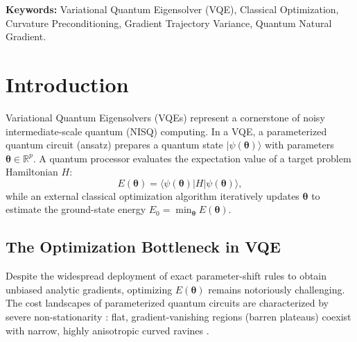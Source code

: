 \documentclass[11pt,a4paper]{article}
\begin{document}
\textbf{Keywords:} Variational Quantum Eigensolver (VQE), Classical Optimization, Curvature Preconditioning, Gradient Trajectory Variance, Quantum Natural Gradient.

\newpage

\section{Introduction}
\label{sec:intro}

Variational Quantum Eigensolvers (VQEs) \cite{peruzzo2014variational,mcclean2016theory} represent a cornerstone of noisy intermediate-scale quantum (NISQ) computing. In a VQE, a parameterized quantum circuit (ansatz) prepares a quantum state $|\psi(\boldsymbol{\theta})\rangle$ with parameters $\boldsymbol{\theta} \in \mathbb{R}^p$. A quantum processor evaluates the expectation value of a target problem Hamiltonian $H$:
\begin{equation}
E(\boldsymbol{\theta}) = \langle \psi(\boldsymbol{\theta}) | H | \psi(\boldsymbol{\theta}) \rangle,
\label{eq:vqe_cost}
\end{equation}
while an external classical optimization algorithm iteratively updates $\boldsymbol{\theta}$ to estimate the ground-state energy $E_0 = \min_{\boldsymbol{\theta}} E(\boldsymbol{\theta})$.

\subsection{The Optimization Bottleneck in VQE}
Despite the widespread deployment of exact parameter-shift rules \cite{mitarai2018quantum,schuld2019evaluating} to obtain unbiased analytic gradients, optimizing $E(\boldsymbol{\theta})$ remains notoriously challenging. The cost landscapes of parameterized quantum circuits are characterized by severe non-stationarity \cite{mcclean2018barren,cerezo2021cost}: flat, gradient-vanishing regions (barren plateaus) coexist with narrow, highly anisotropic curved ravines \cite{mcclean2018barren,cerezo2021cost,wierichs2020avoiding}. 
\end{document}
